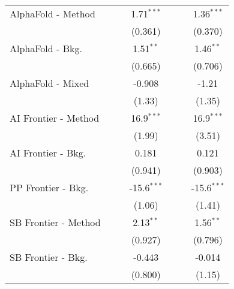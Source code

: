 \begin{tabular}{lcccccc}
   AlphaFold - Method             &               &               & 1.71$^{***}$  &               &               & 1.36$^{***}$\\   
                                  &               &               & (0.361)       &               &               & (0.370)\\   
   AlphaFold - Bkg.               &               &               & 1.51$^{**}$   &               &               & 1.46$^{**}$\\   
                                  &               &               & (0.665)       &               &               & (0.706)\\   
   AlphaFold - Mixed              &               &               & -0.908        &               &               & -1.21\\   
                                  &               &               & (1.33)        &               &               & (1.35)\\   
   AI Frontier - Method           &               &               & 16.9$^{***}$  &               &               & 16.9$^{***}$\\   
                                  &               &               & (1.99)        &               &               & (3.51)\\   
   AI Frontier - Bkg.             &               &               & 0.181         &               &               & 0.121\\   
                                  &               &               & (0.941)       &               &               & (0.903)\\   
   PP Frontier - Bkg.             &               &               & -15.6$^{***}$ &               &               & -15.6$^{***}$\\   
                                  &               &               & (1.06)        &               &               & (1.41)\\   
   SB Frontier - Method           &               &               & 2.13$^{**}$   &               &               & 1.56$^{**}$\\   
                                  &               &               & (0.927)       &               &               & (0.796)\\   
   SB Frontier - Bkg.             &               &               & -0.443        &               &               & -0.014\\   
                                  &               &               & (0.800)       &               &               & (1.15)\\   

\end{tabular}
